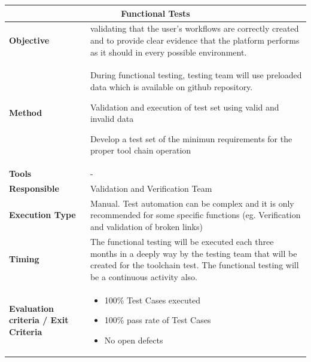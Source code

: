\begin{center}
\begin{longtable}[H]{|p{4cm}|p{9cm}|}\hline
\multicolumn{2}{|c|}{\textbf{Functional Tests}}\\\hline
\textbf{Objective} &  validating that the user’s workflows are correctly created and to provide clear evidence that the platform performs as it should in every possible environment.\\\hline
\textbf{Method} & During functional testing, testing team will use preloaded data which is available on github repository. 

Validation and execution of test set using valid and invalid data

Develop a test set of the minimun requirements for the proper tool chain operation\\\hline
\textbf{Tools} & -\\\hline
\textbf{Responsible} & Validation and Verification Team\\\hline
\textbf{Execution Type} & Manual. Test automation can be complex and it is only recommended for some specific functions (eg. Verification and validation of broken links)\\\hline
\textbf{Timing} & The functional testing will be executed each three months in a deeply way by the testing team that will be created for the toolchain test. The functional testing will be a continuous activity also. \\\hline
\textbf{Evaluation criteria / Exit Criteria} & \begin{itemize}
\item 100\% Test Cases executed
\item 100\% pass rate of Test Cases
\item No open defects
\end{itemize} \\\hline
\end{longtable}
\end{center}

